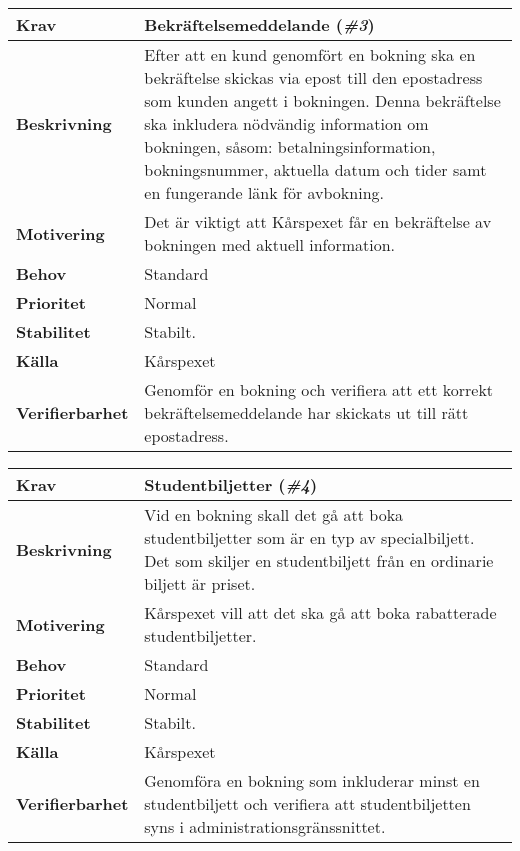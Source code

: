 \documentclass[a4paper, twoside, 11pt, titlepage]{article}
\begin{document}
	\begin{tabular} { p{2.6cm} p{12.5cm} }
		\hline
		\sffamily\textbf{Krav} & Bekräftelsemeddelande (\emph{\#3})  \\
		\hline
		\sffamily\textbf{Beskrivning} & Efter att en kund genomfört en bokning ska en bekräftelse skickas via epost till den epostadress som kunden angett i bokningen. Denna bekräftelse ska inkludera nödvändig information om bokningen, såsom: betalningsinformation, bokningsnummer, aktuella datum och tider samt en fungerande länk för avbokning.  \\
		\hline
		\sffamily\textbf{Motivering} & Det är viktigt att Kårspexet får en bekräftelse av bokningen med aktuell information.  \\
		\hline
		\sffamily\textbf{Behov} & Standard  \\
		\hline
		\sffamily\textbf{Prioritet} & Normal  \\
		\hline
		\sffamily\textbf{Stabilitet} & Stabilt.  \\
		\hline
		\sffamily\textbf{Källa} & Kårspexet  \\
		\hline
		\sffamily\textbf{Verifierbarhet} & Genomför en bokning och verifiera att ett korrekt bekräftelsemeddelande har skickats ut till rätt epostadress.  \\
		\hline
	\end{tabular}
	\vspace{6mm}

	\begin{tabular} { p{2.6cm} p{12.5cm} }
		\hline
		\sffamily\textbf{Krav} & Studentbiljetter (\emph{\#4})  \\
		\hline
		\sffamily\textbf{Beskrivning} & Vid en bokning skall det gå att boka studentbiljetter som är en typ av specialbiljett. Det som skiljer en studentbiljett från en ordinarie biljett är priset.  \\
		\hline
		\sffamily\textbf{Motivering} & Kårspexet vill att det ska gå att boka rabatterade studentbiljetter.  \\
		\hline
		\sffamily\textbf{Behov} & Standard  \\
		\hline
		\sffamily\textbf{Prioritet} & Normal  \\
		\hline
		\sffamily\textbf{Stabilitet} & Stabilt.  \\
		\hline
		\sffamily\textbf{Källa} & Kårspexet  \\
		\hline
		\sffamily\textbf{Verifierbarhet} & Genomföra en bokning som inkluderar minst en studentbiljett och verifiera att studentbiljetten syns i administrationsgränssnittet.  \\
		\hline
	\end{tabular}
	\vspace{6mm}
\end{document}
